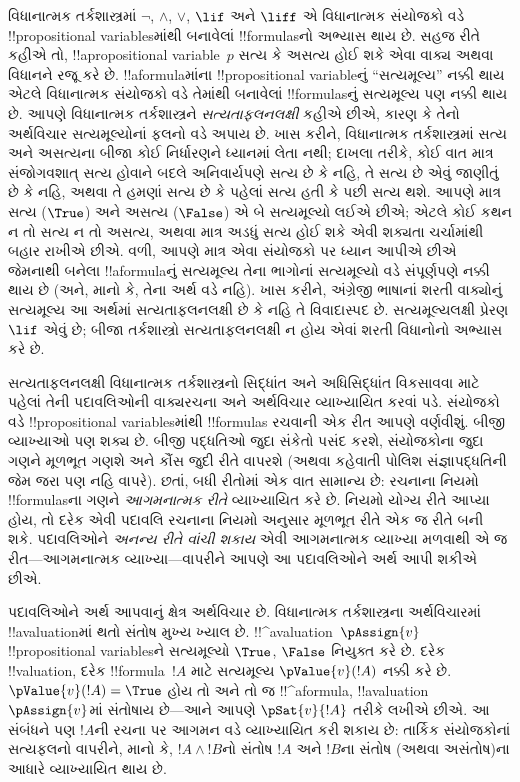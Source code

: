 \documentclass[../../../include/open-logic-section]{subfiles}
\begin{document}


વિધાનાત્મક તર્કશાસ્ત્રમાં $\lnot$, $\land$, $\lor$, $\lif$ અને
$\liff$ એ વિધાનાત્મક સંયોજકો વડે !!{propositional variable}sમાંથી
બનાવેલાં !!{formula}sનો અભ્યાસ થાય છે. સહજ રીતે કહીએ તો,
!!a{propositional variable}~$p$ સત્ય કે અસત્ય હોઈ શકે એવા વાક્ય
અથવા વિધાનને રજૂ કરે છે. !!a{formula}માંના !!{propositional variable}નું
``સત્યમૂલ્ય'' નક્કી થાય એટલે વિધાનાત્મક સંયોજકો વડે તેમાંથી બનાવેલાં
!!{formula}sનું સત્યમૂલ્ય પણ નક્કી થાય છે. આપણે
વિધાનાત્મક તર્કશાસ્ત્રને \emph{સત્યતાફલનલક્ષી} કહીએ છીએ, કારણ કે તેનો
અર્થવિચાર સત્યમૂલ્યોનાં ફલનો વડે અપાય છે. ખાસ કરીને, વિધાનાત્મક
તર્કશાસ્ત્રમાં સત્ય અને અસત્યના બીજા કોઈ નિર્ધારણને ધ્યાનમાં લેતા નથી;
દાખલા તરીકે, કોઈ વાત માત્ર સંજોગવશાત્ સત્ય હોવાને બદલે અનિવાર્યપણે
સત્ય છે કે નહિ, તે સત્ય છે એવું જાણીતું છે કે નહિ, અથવા તે હમણાં
સત્ય છે કે પહેલાં સત્ય હતી કે પછી સત્ય થશે. આપણે માત્ર સત્ય
($\True$) અને અસત્ય ($\False$) એ બે સત્યમૂલ્યો લઈએ છીએ; એટલે કોઈ
કથન ન તો સત્ય ન તો અસત્ય, અથવા માત્ર અડધું સત્ય હોઈ શકે એવી શક્યતા
ચર્ચામાંથી બહાર રાખીએ છીએ. વળી, આપણે માત્ર એવા સંયોજકો પર ધ્યાન
આપીએ છીએ જેમનાથી બનેલા !!a{formula}નું સત્યમૂલ્ય તેના ભાગોનાં
સત્યમૂલ્યો વડે સંપૂર્ણપણે નક્કી થાય છે (અને, માનો કે, તેના અર્થ વડે
નહિ). ખાસ કરીને, અંગ્રેજી ભાષાનાં શરતી વાક્યોનું સત્યમૂલ્ય આ અર્થમાં
સત્યતાફલનલક્ષી છે કે નહિ તે વિવાદાસ્પદ છે. સત્યમૂલ્યલક્ષી પ્રેરણ
$\lif$ એવું છે; બીજા તર્કશાસ્ત્રો સત્યતાફલનલક્ષી ન હોય એવાં શરતી
વિધાનોનો અભ્યાસ કરે છે.

સત્યતાફલનલક્ષી વિધાનાત્મક તર્કશાસ્ત્રનો સિદ્ધાંત અને અધિસિદ્ધાંત
વિકસાવવા માટે પહેલાં તેની પદાવલિઓની વાક્યરચના અને અર્થવિચાર વ્યાખ્યાયિત
કરવાં પડે. સંયોજકો વડે !!{propositional variable}sમાંથી
!!{formula}s રચવાની એક રીત આપણે વર્ણવીશું. બીજી વ્યાખ્યાઓ પણ શક્ય
છે. બીજી પદ્ધતિઓ જુદા સંકેતો પસંદ કરશે, સંયોજકોના જુદા ગણને મૂળભૂત
ગણશે અને કૌંસ જુદી રીતે વાપરશે (અથવા કહેવાતી પોલિશ સંજ્ઞાપદ્ધતિની
જેમ જરા પણ નહિ વાપરે). છતાં, બધી રીતોમાં એક વાત સામાન્ય છે: રચનાના
નિયમો !!{formula}sના ગણને \emph{આગમનાત્મક રીતે} વ્યાખ્યાયિત કરે છે.
નિયમો યોગ્ય રીતે આપ્યા હોય, તો દરેક એવી પદાવલિ રચનાના નિયમો અનુસાર મૂળભૂત રીતે
એક જ રીતે બની શકે. પદાવલિઓને \emph{અનન્ય રીતે વાંચી શકાય} એવી આગમનાત્મક
વ્યાખ્યા મળવાથી એ જ રીત---આગમનાત્મક વ્યાખ્યા---વાપરીને આપણે આ
પદાવલિઓને અર્થ આપી શકીએ છીએ.

પદાવલિઓને અર્થ આપવાનું ક્ષેત્ર અર્થવિચાર છે. વિધાનાત્મક તર્કશાસ્ત્રના
અર્થવિચારમાં !!a{valuation}માં થતો સંતોષ મુખ્ય ખ્યાલ છે.
!!^a{valuation}~$\pAssign{v}$ !!{propositional variable}sને સત્યમૂલ્યો
$\True$, $\False$ નિયુક્ત કરે છે. દરેક !!{valuation}, દરેક
!!{formula}~$!A$ માટે સત્યમૂલ્ય $\pValue{v}(!A)$ નક્કી કરે છે.
$\pValue{v}(!A)=\True$ હોય તો અને તો જ !!^a{formula},
!!a{valuation}~$\pAssign{v}$માં સંતોષાય છે---આને આપણે
$\pSat{v}{!A}$ તરીકે લખીએ છીએ. આ સંબંધને પણ $!A$ની રચના પર આગમન
વડે વ્યાખ્યાયિત કરી શકાય છે: તાર્કિક સંયોજકોનાં સત્યફલનો વાપરીને,
માનો કે, $!A\land !B$નો સંતોષ $!A$ અને $!B$ના સંતોષ (અથવા
અસંતોષ)ના આધારે વ્યાખ્યાયિત થાય છે.
\end{document}
